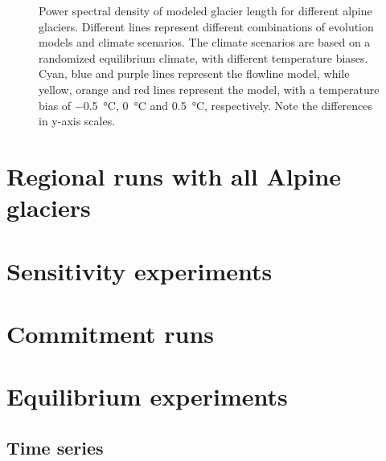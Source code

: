 \begin{figure}[htp]
        \caption{Power spectral density of modeled glacier length for different alpine glaciers. Different lines represent different combinations of evolution models and climate scenarios. The climate scenarios are based on a randomized equilibrium climate, with different temperature biases. Cyan, blue and purple lines represent the flowline model, while yellow, orange and red lines represent the \vas{} model, with a temperature bias of \SI{-.5}{\celsius}, \SI{0}{\celsius} and \SI{+.5}{\celsius}, respectively. Note the differences in y-axis scales.}
        \label{fig:psd}
      \end{figure}
    


  \section{Regional runs with all Alpine glaciers} %
  \label{sec:regional_runs_with_all_alpine_glaciers_results}



  \section{Sensitivity experiments} %
  \label{sec:sensitivity_experiments_results}



  \section{Commitment runs} %
  \label{sec:commitment_runs_results}




\section{Equilibrium experiments} %
\label{sec:equilibrium_experiments_results}
    
    \subsection{Time series} %
    \label{sec:time_series_results}

